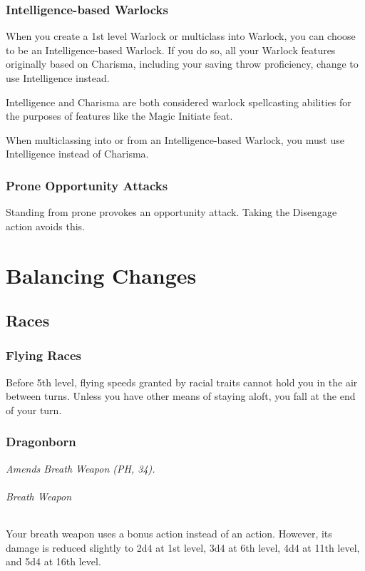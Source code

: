 \documentclass[letterpaper,twocolumn,openany,nodeprecatedcode]{dndbook}
\begin{document}
\label{gameplay-warlock-int}
\subsection{Intelligence-based Warlocks}
When you create a 1st level Warlock or multiclass into Warlock, you can choose to be an Intelligence-based Warlock. If you do so, all your Warlock features originally based on Charisma, including your saving throw proficiency, change to use Intelligence instead.

Intelligence and Charisma are both considered warlock spellcasting abilities for the purposes of features like the Magic Initiate feat.

When multiclassing into or from an Intelligence-based Warlock, you must use Intelligence instead of Charisma.

\subsection{Prone Opportunity Attacks}
Standing from prone provokes an opportunity attack. Taking the Disengage action avoids this.









\chapter{Balancing Changes}

\label{balance-races}
\section{Races}
\label{balance-race-flying}
\subsection{Flying Races} Before 5th level, flying speeds granted by racial traits cannot hold you in the air between turns. Unless you have other means of staying aloft, you fall at the end of your turn.

\label{balance-race-dragonborn}
\subsection{Dragonborn}
\textit{Amends Breath Weapon (PH, 34).}

\subparagraph{Breath Weapon} Your breath weapon uses a bonus action instead of an action. However, its damage is reduced slightly to 2d4 at 1st level, 3d4 at 6th level, 4d4 at 11th level, and 5d4 at 16th level.
\end{document}
